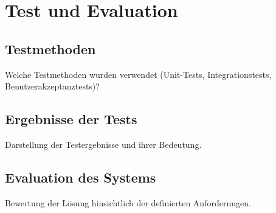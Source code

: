\chapter{Test und Evaluation}

\section{Testmethoden}
Welche Testmethoden wurden verwendet (Unit-Tests, Integrationstests, Benutzerakzeptanztests)?
\section{Ergebnisse der Tests}
Darstellung der Testergebnisse und ihrer Bedeutung.

\section{Evaluation des Systems}
Bewertung der Lösung hinsichtlich der definierten Anforderungen.